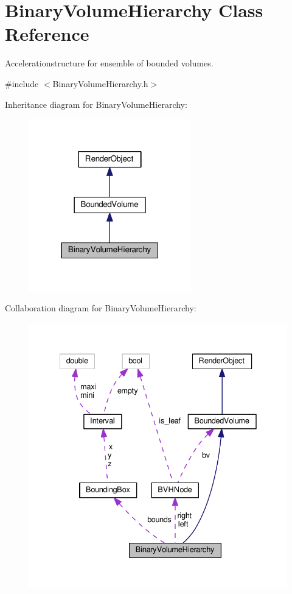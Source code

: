 \hypertarget{classBinaryVolumeHierarchy}{}\section{Binary\+Volume\+Hierarchy Class Reference}
\label{classBinaryVolumeHierarchy}


Accelerationstructure for ensemble of bounded volumes.  




{\ttfamily \#include $<$Binary\+Volume\+Hierarchy.\+h$>$}



Inheritance diagram for Binary\+Volume\+Hierarchy\+:\nopagebreak
\begin{figure}[H]
\begin{center}
\leavevmode
\includegraphics[width=199pt]{classBinaryVolumeHierarchy__inherit__graph}
\end{center}
\end{figure}


Collaboration diagram for Binary\+Volume\+Hierarchy\+:\nopagebreak
\begin{figure}[H]
\begin{center}
\leavevmode
\includegraphics[width=335pt]{classBinaryVolumeHierarchy__coll__graph}
\end{center}
\end{figure}
